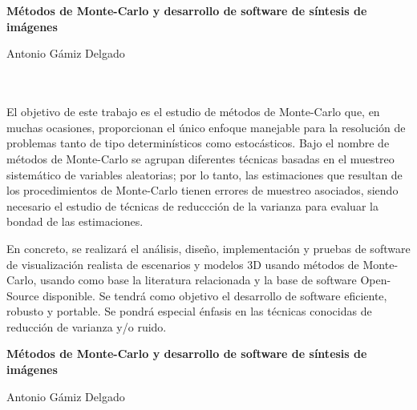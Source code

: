 \chapter*{}


\cleardoublepage
\thispagestyle{empty}

\begin{center}
{\large\bfseries Métodos de Monte-Carlo y desarrollo de software de síntesis de imágenes}\\
\end{center}
\begin{center}
Antonio Gámiz Delgado\\
\end{center}

\\

\vspace{0.7cm}
\\

El objetivo de este trabajo es el estudio de métodos de Monte-Carlo que, en muchas ocasiones, proporcionan el único enfoque manejable para la resolución de problemas tanto de tipo determinísticos como estocásticos. Bajo el nombre de métodos de Monte-Carlo se agrupan diferentes técnicas basadas en el muestreo sistemático de variables aleatorias; por lo tanto, las estimaciones que resultan de los procedimientos de Monte-Carlo tienen errores de muestreo asociados, siendo necesario el estudio de técnicas de reduccción de la varianza para evaluar la bondad de las estimaciones.

En concreto, se realizará el análisis, diseño, implementación y pruebas de software de visualización realista de escenarios y modelos 3D usando métodos de Monte-Carlo, usando como base la literatura relacionada y la base de software Open-Source disponible. Se tendrá como objetivo el desarrollo de software eficiente, robusto y portable. Se pondrá especial énfasis en las técnicas conocidas de reducción de varianza y/o ruido.


\cleardoublepage
\thispagestyle{empty}

\begin{center}
{\large\bfseries Métodos de Monte-Carlo y desarrollo de software de síntesis de imágenes}\\
\end{center}
\begin{center}
Antonio Gámiz Delgado\\
\end{center}

